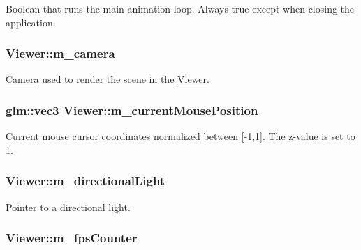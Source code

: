 Boolean that runs the main animation loop. Always true except when closing the application. \hypertarget{classViewer_aca2cfeaed36c2ea6711d694ace109aca}{
\subsubsection[{m\+\_\+camera}]{ Viewer\+::m\+\_\+camera\hspace{0.3cm}{\ttfamily [private]}}}\label{classViewer_aca2cfeaed36c2ea6711d694ace109aca}
\hyperlink{classCamera}{Camera} used to render the scene in the \hyperlink{classViewer}{Viewer}. \hypertarget{classViewer_a0bdff57aff91916b2fa3e239d474ab53}{
\subsubsection[{m\+\_\+current\+Mouse\+Position}]{\setlength{\rightskip}{0pt plus 5cm}glm\+::vec3 Viewer\+::m\+\_\+current\+Mouse\+Position\hspace{0.3cm}{\ttfamily [private]}}}\label{classViewer_a0bdff57aff91916b2fa3e239d474ab53}
Current mouse cursor coordinates normalized between \mbox{[}-\/1,1\mbox{]}. The z-\/value is set to 1. \hypertarget{classViewer_a0c19f64be563889aa53ce1cdde30e322}{
\subsubsection[{m\+\_\+directional\+Light}]{ Viewer\+::m\+\_\+directional\+Light\hspace{0.3cm}{\ttfamily [private]}}}\label{classViewer_a0c19f64be563889aa53ce1cdde30e322}
Pointer to a directional light. \hypertarget{classViewer_a837a1d9dcf94c41c637e931989261554}{
\subsubsection[{m\+\_\+fps\+Counter}]{ Viewer\+::m\+\_\+fps\+Counter\hspace{0.3cm}{\ttfamily [private]}}}\label{classViewer_a837a1d9dcf94c41c637e931989261554}
